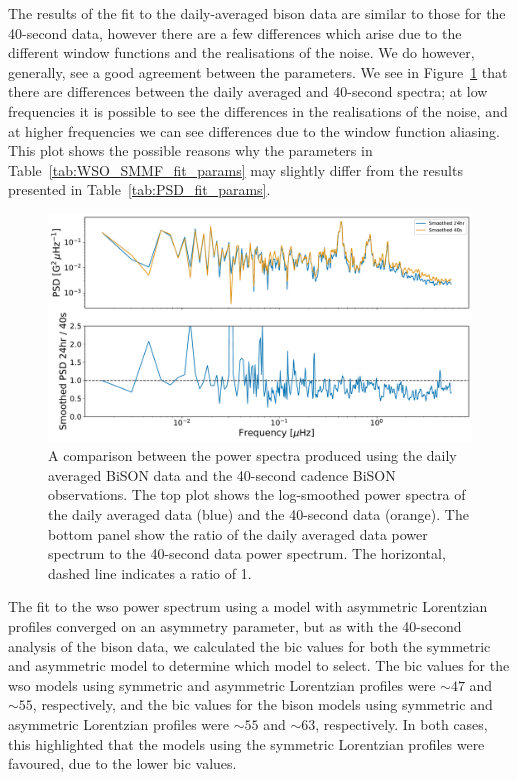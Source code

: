 The results of the fit to the daily-averaged \gls{bison} data are similar to those for the 40-second data, however there are a few differences which arise due to the different window functions and the realisations of the noise. We do however, generally, see a good agreement between the parameters. We see in Figure~\ref{fig:BiSON_PSD_40_vs_24} that there are differences between the daily averaged and 40-second spectra; at low frequencies it is possible to see the differences in the realisations of the noise, and at higher frequencies we can see differences due to the window function aliasing. This plot shows the possible reasons why the parameters in Table~\ref{tab:WSO_SMMF_fit_params} may slightly differ from the results presented in Table~\ref{tab:PSD_fit_params}.

\begin{figure}[ht!]
	\centering
	\includegraphics[width=0.85\columnwidth]{BiSON_24h_vs_40s.pdf}
	\caption{A comparison between the power spectra produced using the daily averaged BiSON data and the 40-second cadence BiSON observations. The top plot shows the log-smoothed power spectra of the daily averaged data (blue) and the 40-second data (orange). The bottom panel show the ratio of the daily averaged data power spectrum to the 40-second data power spectrum. The horizontal, dashed line indicates a ratio of 1.}
	\label{fig:BiSON_PSD_40_vs_24}
\end{figure}


The fit to the \gls{wso} power spectrum using a model with asymmetric Lorentzian profiles converged on an asymmetry parameter, but as with the 40-second analysis of the \gls{bison} data, we calculated the \gls{bic} values for both the symmetric and asymmetric model to determine which model to select. The \gls{bic} values for the \gls{wso} models using symmetric and asymmetric Lorentzian profiles were $\sim47$ and $\sim55$, respectively, and the \gls{bic} values for the \gls{bison} models using symmetric and asymmetric Lorentzian profiles were $\sim55$ and $\sim63$, respectively. In both cases, this highlighted that the models using the symmetric Lorentzian profiles were favoured, due to the lower \gls{bic} values. 

